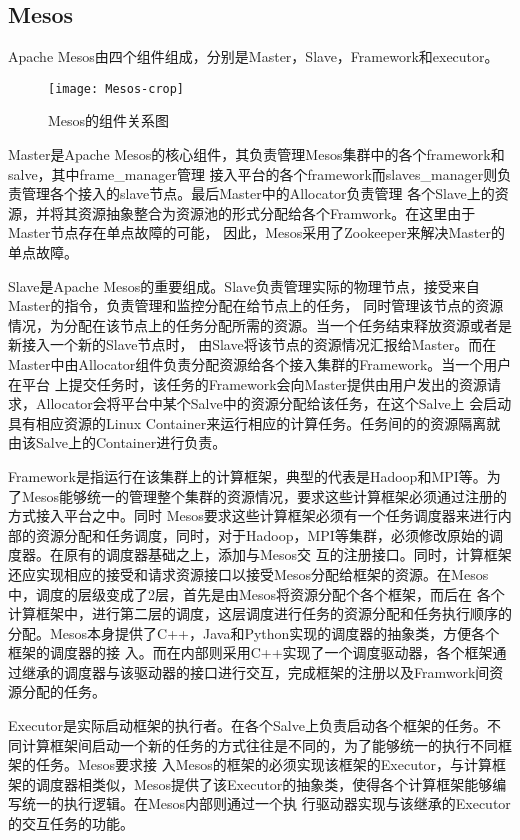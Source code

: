 \subsection{Mesos}

Apache Mesos由四个组件组成，分别是Master，Slave，Framework和executor。
\begin{figure}[htbp]
\centering\texttt{[image: Mesos-crop]}
\caption{Mesos的组件关系图}\label{fig:openstack}
\end{figure}
Master是Apache Mesos的核心组件，其负责管理Mesos集群中的各个framework和salve，其中frame\_manager管理
接入平台的各个framework而slaves\_manager则负责管理各个接入的slave节点。最后Master中的Allocator负责管理
各个Slave上的资源，并将其资源抽象整合为资源池的形式分配给各个Framwork。在这里由于Master节点存在单点故障的可能，
因此，Mesos采用了Zookeeper来解决Master的单点故障。

Slave是Apache Mesos的重要组成。Slave负责管理实际的物理节点，接受来自Master的指令，负责管理和监控分配在给节点上的任务，
同时管理该节点的资源情况，为分配在该节点上的任务分配所需的资源。当一个任务结束释放资源或者是新接入一个新的Slave节点时，
由Slave将该节点的资源情况汇报给Master。而在Master中由Allocator组件负责分配资源给各个接入集群的Framework。当一个用户在平台
上提交任务时，该任务的Framework会向Master提供由用户发出的资源请求，Allocator会将平台中某个Salve中的资源分配给该任务，在这个Salve上
会启动具有相应资源的Linux Container来运行相应的计算任务。任务间的的资源隔离就由该Salve上的Container进行负责。

Framework是指运行在该集群上的计算框架，典型的代表是Hadoop和MPI等。为了Mesos能够统一的管理整个集群的资源情况，要求这些计算框架必须通过注册的方式接入平台之中。同时
Mesos要求这些计算框架必须有一个任务调度器来进行内部的资源分配和任务调度，同时，对于Hadoop，MPI等集群，必须修改原始的调度器。在原有的调度器基础之上，添加与Mesos交
互的注册接口。同时，计算框架还应实现相应的接受和请求资源接口以接受Mesos分配给框架的资源。在Mesos中，调度的层级变成了2层，首先是由Mesos将资源分配个各个框架，而后在
各个计算框架中，进行第二层的调度，这层调度进行任务的资源分配和任务执行顺序的分配。Mesos本身提供了C++，Java和Python实现的调度器的抽象类，方便各个框架的调度器的接
入。而在内部则采用C++实现了一个调度驱动器，各个框架通过继承的调度器与该驱动器的接口进行交互，完成框架的注册以及Framwork间资源分配的任务。

Executor是实际启动框架的执行者。在各个Salve上负责启动各个框架的任务。不同计算框架间启动一个新的任务的方式往往是不同的，为了能够统一的执行不同框架的任务。Mesos要求接
入Mesos的框架的必须实现该框架的Executor，与计算框架的调度器相类似，Mesos提供了该Executor的抽象类，使得各个计算框架能够编写统一的执行逻辑。在Mesos内部则通过一个执
行驱动器实现与该继承的Executor的交互任务的功能。

